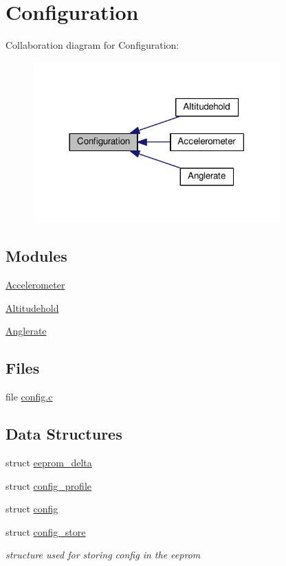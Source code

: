 \hypertarget{group__config}{\section{Configuration}
\label{group__config}
}
Collaboration diagram for Configuration\+:\nopagebreak
\begin{figure}[H]
\begin{center}
\leavevmode
\includegraphics[width=270pt]{group__config}
\end{center}
\end{figure}
\subsection*{Modules}
\begin{DoxyCompactItemize}
\item 
\hyperlink{group__accelerometer}{Accelerometer}
\item 
\hyperlink{group__altitudehold}{Altitudehold}
\item 
\hyperlink{group__anglerate}{Anglerate}
\end{DoxyCompactItemize}
\subsection*{Files}
\begin{DoxyCompactItemize}
\item 
file \hyperlink{config_8c}{config.\+c}
\end{DoxyCompactItemize}
\subsection*{Data Structures}
\begin{DoxyCompactItemize}
\item 
struct \hyperlink{structeeprom__delta}{eeprom\+\_\+delta}
\item 
struct \hyperlink{structconfig__profile}{config\+\_\+profile}
\item 
struct \hyperlink{structconfig}{config}
\item 
struct \hyperlink{structconfig__store}{config\+\_\+store}
\begin{DoxyCompactList}\small\item\em structure used for storing config in the eeprom \end{DoxyCompactList}\end{DoxyCompactItemize}
